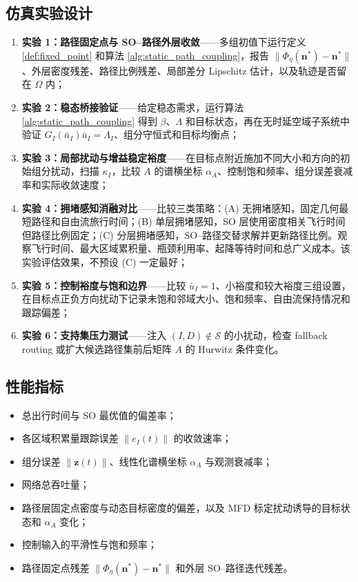 \documentclass[a4paper,12pt]{article}
\theoremstyle{plain}
\theoremstyle{definition}
\theoremstyle{remark}
\begin{document}
\subsection{仿真实验设计}
\begin{enumerate}
    \item \textbf{实验 1：路径固定点与 SO--路径外层收敛}——多组初值下运行定义 \ref{def:fixed_point} 和算法 \ref{alg:static_path_coupling}，报告 $\|\Phi_\eta(\bm n^*)-\bm n^*\|$、外层密度残差、路径比例残差、局部差分 Lipschitz 估计，以及轨迹是否留在 $\Omega$ 内；
    \item \textbf{实验 2：稳态桥接验证}——给定稳态需求，运行算法 \ref{alg:static_path_coupling} 得到 $\beta$、$\Lambda$ 和目标状态，再在无时延空域子系统中验证 $G_I(\bar n_I)\bar u_I=\Lambda_I$、组分守恒式和目标均衡点；
    \item \textbf{实验 3：局部扰动与增益稳定裕度}——在目标点附近施加不同大小和方向的初始组分扰动，扫描 $\kappa_I$，比较 $A$ 的谱横坐标 $\alpha_A$、控制饱和频率、组分误差衰减率和实际收敛速度；
    \item \textbf{实验 4：拥堵感知消融对比}——比较三类策略：(A) 无拥堵感知，固定几何最短路径和自由流旅行时间；(B) 单层拥堵感知，SO 层使用密度相关飞行时间但路径比例固定；(C) 分层拥堵感知，SO--路径交替求解并更新路径比例。观察飞行时间、最大区域累积量、瓶颈利用率、起降等待时间和总广义成本。该实验评估效果，不预设 (C) 一定最好；
    \item \textbf{实验 5：控制裕度与饱和边界}——比较 $\bar u_I=1$、小裕度和较大裕度三组设置，在目标点正负方向扰动下记录未饱和邻域大小、饱和频率、自由流保持情况和跟踪偏差；
    \item \textbf{实验 6：支持集压力测试}——注入 $(I,D)\notin\mathcal S$ 的小扰动，检查 fallback routing 或扩大候选路径集前后矩阵 $A$ 的 Hurwitz 条件变化。
\end{enumerate}

\subsection{性能指标}
\begin{itemize}
    \item 总出行时间与 SO 最优值的偏差率；
    \item 各区域积累量跟踪误差 $\|e_I(t)\|$ 的收敛速率；
    \item 组分误差 $\|\bm z(t)\|$、线性化谱横坐标 $\alpha_A$ 与观测衰减率；
    \item 网络总吞吐量；
    \item 路径层固定点密度与动态目标密度的偏差，以及 MFD 标定扰动诱导的目标状态和 $\alpha_A$ 变化；
    \item 控制输入的平滑性与饱和频率；
    \item 路径固定点残差 $\|\Phi_\eta(\bm n^*)-\bm n^*\|$ 和外层 SO--路径迭代残差。
\end{itemize}
\end{document}
